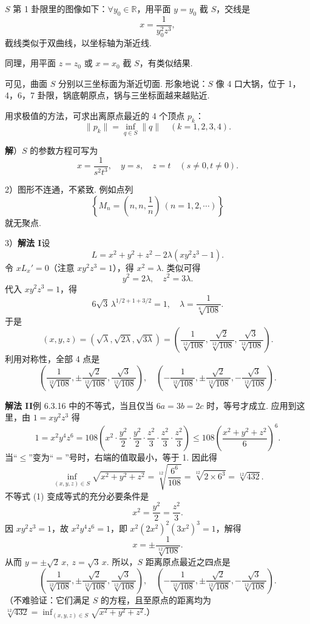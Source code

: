 \documentclass[UTF8,12pt,a4paper,fontset=fandol]{ctexart}
\begin{document}
$S$ 第 1 卦限里的图像如下：$\forall y_0\in\mathbb{R}$，用平面 $y=y_0$ 截 $S$，交线是
\[
  x=\frac{1}{y_0^2z^3},
\]
截线类似于双曲线，以坐标轴为渐近线.

同理，用平面 $z=z_0$ 或 $x=x_0$ 截 $S$，有类似结果.

可见，曲面 $S$ 分别以三坐标面为渐近切面. 形象地说：$S$ 像 4 口大锅，位于 1，4，6，7 卦限，锅底朝原点，锅与三坐标面越来越贴近.

用求极值的方法，可求出离原点最近的 4 个顶点 $p_k$：
\[
  \|p_k\|=\inf_{q\in S}\|q\|\quad(k=1,2,3,4).
\]

\noindent\textbf{解}）$S$ 的参数方程可写为
\[
  x=\frac{1}{s^2t^3},\quad y=s,\quad z=t\quad(s\ne0,t\ne0).
\]

2）图形不连通，不紧致. 例如点列
\[
  \left\{M_n=\left(n,n,\frac1n\right)\ (n=1,2,\cdots)\right\}
\]
就无聚点.

3）\noindent\textbf{解法 I}\quad 设
\[
  L=x^2+y^2+z^2-2\lambda(xy^2z^3-1).
\]
令 $xL_x'=0$（注意 $xy^2z^3=1$），得 $x^2=\lambda$. 类似可得
\[
  y^2=2\lambda,\quad z^2=3\lambda.
\]
代入 $xy^2z^3=1$，得
\[
  6\sqrt3\,\lambda^{1/2+1+3/2}=1,\quad
  \lambda=\frac1{\sqrt[6]{108}}.
\]
于是
\[
  (x,y,z)=(\sqrt\lambda,\sqrt{2\lambda},\sqrt{3\lambda})
  =\left(\frac1{\sqrt[12]{108}},\frac{\sqrt2}{\sqrt[12]{108}},
  \frac{\sqrt3}{\sqrt[12]{108}}\right).
\]
利用对称性，全部 4 点是
\[
  \left(\frac1{\sqrt[12]{108}},\pm\frac{\sqrt2}{\sqrt[12]{108}},
  \frac{\sqrt3}{\sqrt[12]{108}}\right),\quad
  \left(-\frac1{\sqrt[12]{108}},\pm\frac{\sqrt2}{\sqrt[12]{108}},
  -\frac{\sqrt3}{\sqrt[12]{108}}\right).
\]

\noindent\textbf{解法 II}\quad 例 6.3.16 中的不等式，当且仅当 $6a=3b=2c$ 时，等号才成立. 应用到这里，由 $1=xy^2z^3$ 得
\[
  1=x^2y^4z^6
  =108\left(x^2\cdot\frac{y^2}{2}\cdot\frac{y^2}{2}\cdot
  \frac{z^2}{3}\cdot\frac{z^2}{3}\cdot\frac{z^2}{3}\right)
  \le108\left(\frac{x^2+y^2+z^2}{6}\right)^6. \tag{1}
\]
当“$\le$”变为“$=$”号时，右端的值取最小，等于 1. 因此得
\[
  \inf_{(x,y,z)\in S}\sqrt{x^2+y^2+z^2}
  =\sqrt[12]{\frac{6^6}{108}}
  =\sqrt[12]{2\times6^3}
  =\sqrt[12]{432}.
\]
不等式 (1) 变成等式的充分必要条件是
\[
  x^2=\frac{y^2}{2}=\frac{z^2}{3}.
\]
因 $xy^2z^3=1$，故 $x^2y^4z^6=1$，即 $x^2(2x^2)^2(3x^2)^3=1$，解得
\[
  x=\pm\frac1{\sqrt[12]{108}}.
\]
从而 $y=\pm\sqrt2\,x,\ z=\sqrt3\,x$. 所以，$S$ 距离原点最近之四点是
\[
  \left(\frac1{\sqrt[12]{108}},\pm\frac{\sqrt2}{\sqrt[12]{108}},
  \frac{\sqrt3}{\sqrt[12]{108}}\right),\quad
  \left(-\frac1{\sqrt[12]{108}},\pm\frac{\sqrt2}{\sqrt[12]{108}},
  -\frac{\sqrt3}{\sqrt[12]{108}}\right).
\]
（不难验证：它们满足 $S$ 的方程，且至原点的距离均为 $\sqrt[12]{432}=\inf_{(x,y,z)\in S}\sqrt{x^2+y^2+z^2}$.）
\end{document}

